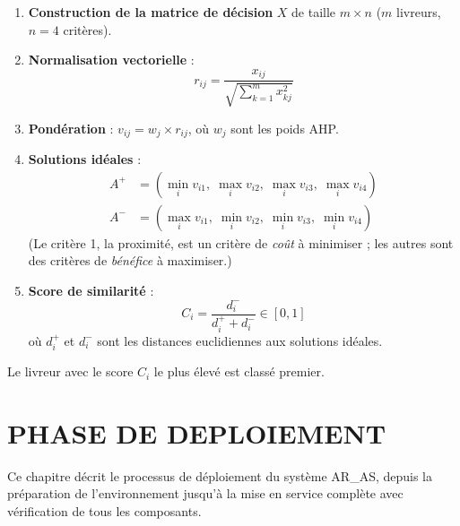 \begin{enumerate}
    \item \textbf{Construction de la matrice de décision} $X$ de taille $m \times n$ ($m$ livreurs, $n = 4$ critères).

    \item \textbf{Normalisation vectorielle} :
    \begin{equation}
    r_{ij} = \frac{x_{ij}}{\sqrt{\sum_{k=1}^{m} x_{kj}^2}}
    \label{eq:topsis-normalize}
    \end{equation}

    \item \textbf{Pondération} : $v_{ij} = w_j \times r_{ij}$, où $w_j$ sont les poids AHP.

    \item \textbf{Solutions idéales} :
    \begin{align}
    A^+ &= \left(\min_i v_{i1},\; \max_i v_{i2},\; \max_i v_{i3},\; \max_i v_{i4}\right) \label{eq:ideal-pos} \\
    A^- &= \left(\max_i v_{i1},\; \min_i v_{i2},\; \min_i v_{i3},\; \min_i v_{i4}\right) \label{eq:ideal-neg}
    \end{align}
    (Le critère 1, la proximité, est un critère de \textit{coût} à minimiser ; les autres sont des critères de \textit{bénéfice} à maximiser.)

    \item \textbf{Score de similarité} :
    \begin{equation}
    C_i = \frac{d_i^-}{d_i^+ + d_i^-} \in [0, 1]
    \label{eq:topsis-score}
    \end{equation}
    où $d_i^+$ et $d_i^-$ sont les distances euclidiennes aux solutions idéales.
\end{enumerate}

Le livreur avec le score $C_i$ le plus élevé est classé premier.



\chapter{PHASE DE DEPLOIEMENT}

Ce chapitre décrit le processus de déploiement du système AR\_AS, depuis la préparation de l'environnement jusqu'à la mise en service complète avec vérification de tous les composants.


